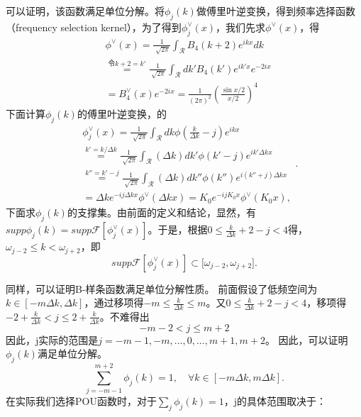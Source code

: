 可以证明，该函数满足单位分解。将$\phi_j(k)$做傅里叶逆变换，得到频率选择函数（frequency selection kernel），为了得到$\phi_{j}^{\vee}(x)$，我们先求$\phi^{\vee}(x)$，得
\begin{equation}
    \begin{aligned} 
        &\phi^{\vee}(x) =\frac{1}{\sqrt[]{2\pi } }\int_{\mathcal{R} }^{}  B_4(k+2)e^{ikx}dk \\
      &\overset{令k+2=k'}{=} \frac{1}{\sqrt[]{2\pi } }\int_{\mathcal{R} }^{}dk'B_4(k')e^{ik'x}e^{-2ix}\\
      &=B_4^{\vee } (x)e^{-2ix}=\frac{1}{(2\pi)^2}(\frac{\sin{x/2}}{x/2})^4
      \end{aligned}
\end{equation}
下面计算$\phi_j(k)$的傅里叶逆变换，的
\begin{equation}
    \begin{aligned} 
        & \phi_{j}^{\vee}(x)=\frac{1}{\sqrt[]{2\pi } }\int_{\mathcal{R} }^{}dk\phi(\frac{k}{\Delta k}-j )e^{ikx}  \\
       &\overset{k'=k/\Delta k}{=}\frac{1}{\sqrt[]{2\pi } }\int_{\mathcal{R} }^{}  (\Delta k)dk'\phi (k'-j)e^{ik'\Delta kx}  \\
       &\overset{k''=k'-j}{=}\frac{1}{\sqrt[]{2\pi } }\int_{\mathcal{R} }^{}  (\Delta k)dk''\phi (k'')e^{i(k''+j)\Delta kx}\\
       &=\Delta ke^{-ij\Delta kx}\phi^{\vee}(\Delta kx)=K_0e^{-ijK_{0}x}%
       \phi^{\vee}(K_{0}x),
       \end{aligned}.
\end{equation}
下面求$\phi_{j}(k)$的支撑集。由前面的定义和结论，显然，有$supp\phi _j(k)=supp\mathcal{F}[\phi_{j}^{\vee}(x)]$。于是，根据$0\le \frac{k}{\Delta k}+2-j<4$得，$\omega_{j-2}\le k<\omega_{j+2}$，即
\begin{equation}
    supp\mathcal{F}[\phi_{j}^{\vee}(x)]\subset\lbrack\omega_{j-2}, \omega_{j+2}].
\end{equation}

同样，可以证明B-样条函数满足单位分解性质。
前面假设了低频空间为$k\in [-m\Delta k,\Delta k]$，通过移项得$-m\le \frac{k}{\Delta k}\le m$。又$0\le \frac{k}{\Delta k}+2-j<4$，移项得$-2+\frac{k}{\Delta k}<j\le 2+\frac{k}{\Delta k}$。不难得出
\begin{equation*}
    -m-2<j\le m+2
\end{equation*}
因此，j实际的范围是$j = -m-1,-m,...,0,...,m+1,m+2$。
因此，可以证明$\phi_{j}(k)$满足单位分解。
\begin{equation}\label{eq:sum1C4}
  \sum_{j=-m-1}^{m+2}\phi_j(k) = 1 ,\quad \forall k\in [-m\Delta k, m\Delta k].
\end{equation}
在实际我们选择POU函数时，对于$\sum_{j}^{}\phi_j(k) = 1$，j的具体范围取决于：

